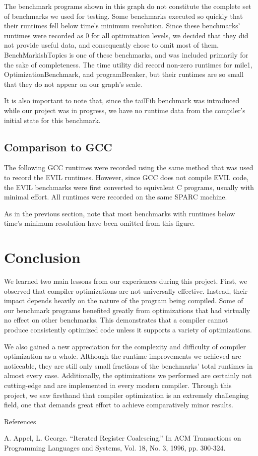 \documentclass[12pt]{article}
\begin{document}
\begin{multicols}{2}
The benchmark programs shown in this graph do not constitute the complete set of benchmarks we used for testing.
Some benchmarks executed so quickly that their runtimes fell below time’s minimum resolution.
Since these benchmarks’ runtimes were recorded as 0 for all optimization levels, we decided that they did not provide useful data, and consequently chose to omit most of them.
BenchMarkishTopics is one of these benchmarks, and was included primarily for the sake of completeness.
The time utility did record non-zero runtimes for mile1, OptimizationBenchmark, and programBreaker, but their runtimes are so small that they do not appear on our graph’s scale.

It is also important to note that, since the tailFib benchmark was introduced while our project was in progress, we have no runtime data from the compiler’s initial state for this benchmark.

\subsection{Comparison to GCC}
The following GCC runtimes were recorded using the same method that was used to record the EVIL runtimes.
However, since GCC does not compile EVIL code, the EVIL benchmarks were first converted to equivalent C programs, usually with minimal effort.
All runtimes were recorded on the same SPARC machine.


As in the previous section, note that most benchmarks with runtimes below time’s minimum resolution have been omitted from this figure.

\section{Conclusion}
We learned two main lessons from our experiences during this project.
First, we observed that compiler optimizations are not universally effective.
Instead, their impact depends heavily on the nature of the program being compiled.
Some of our benchmark programs benefited greatly from optimizations that had virtually no effect on other benchmarks.
This demonstrates that a compiler cannot produce consistently optimized code unless it supports a variety of optimizations.

We also gained a new appreciation for the complexity and difficulty of compiler optimization as a whole.
Although the runtime improvements we achieved are noticeable, they are still only small fractions of the benchmarks' total runtimes in almost every case.
Additionally, the optimizations we performed are certainly not cutting-edge and are implemented in every modern compiler.
Through this project, we saw firsthand that compiler optimization is an extremely challenging field, one that demands great effort to achieve comparatively minor results.

References

A.
Appel, L.
George.
“Iterated Register Coalescing.” In ACM Transactions on Programming Languages and Systems, Vol.
18, No.
3, 1996, pp.
300-324.

\end{multicols}

\newpage


\end{document}
